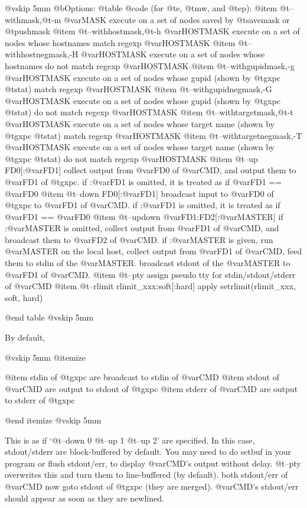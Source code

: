 @vskip 5mm
@b{Options: }
@table @code
(for @t{e}, @t{mw}, and @t{ep}):
@item   @t{--withmask},@t{-m} @var{MASK}
    execute on a set of nodes saved by @t{savemask} or @t{pushmask}
@item   @t{--withhostmask},@t{-h} @var{HOSTMASK}
    execute on a set of nodes whose hostnames match regexp @var{HOSTMASK}
@item   @t{--withhostnegmask},-H @var{HOSTMASK}
    execute on a set of nodes whose hostnames do not match regexp @var{HOSTMASK}
@item   @t{--withgupidmask},-g @var{HOSTMASK}
    execute on a set of nodes whose gupid (shown by @t{gxpc} @t{stat}) 
    match regexp @var{HOSTMASK}
@item   @t{--withgupidnegmask},-G @var{HOSTMASK}
    execute on a set of nodes whose gupid (shown by @t{gxpc} @t{stat}) 
    do not match regexp @var{HOSTMASK}
@item   @t{--withtargetmask},@t{-t} @var{HOSTMASK}
    execute on a set of nodes whose target name (shown by @t{gxpc} @t{stat}) 
    match regexp @var{HOSTMASK}
@item   @t{--withtargetnegmask},-T @var{HOSTMASK}
    execute on a set of nodes whose target name (shown by @t{gxpc} @t{stat}) 
    do not match regexp @var{HOSTMASK}
@item   @t{--up} FD0[:@var{FD1}]
    collect output from @var{FD0} of @var{CMD}, and output them to @var{FD1} of @t{gxpc}.
    if :@var{FD1} is omitted, it is treated as if @var{FD1} == @var{FD0}
@item   @t{--down} FD0[:@var{FD1}]
    broadcast input to @var{FD0} of @t{gxpc} to @var{FD1} of @var{CMD}.
    if :@var{FD1} is omitted, it is treated as if @var{FD1} == @var{FD0}
@item   @t{--updown} @var{FD1}:FD2[:@var{MASTER}]
    if :@var{MASTER} is omitted, collect output from @var{FD1} of @var{CMD},
    and broadcast them to @var{FD2} of @var{CMD}.
    if :@var{MASTER} is given, run @var{MASTER} on the local host, collect
    output from @var{FD1} of @var{CMD}, feed them to stdin of the @var{MASTER}.
    broadcast stdout of the @var{MASTER} to @var{FD1} of @var{CMD}.
@item   @t{--pty}
    assign pseudo tty for stdin/stdout/stderr of @var{CMD}
@item   @t{--rlimit} rlimit_xxx:soft[:hard]
    apply setrlimit(rlimit_xxx, soft, hard)

@end table
@vskip 5mm

By default,

@vskip 5mm
@itemize

@item  stdin of @t{gxpc} are broadcast to stdin of @var{CMD}
@item  stdout of @var{CMD} are output to stdout of @t{gxpc}
@item  stderr of @var{CMD} are output to stderr of @t{gxpc}

@end itemize
@vskip 5mm

This is as if `@t{--down} 0 @t{--up} 1 @t{--up} 2' are specified.  In this
case, stdout/stderr are block-buffered by default.  You may need
to do setbuf in your program or flush stdout/err, to display
@var{CMD}'s output without delay.  @t{--pty} overwrites this and turn them
to line-buffered (by default).  both stdout/err of @var{CMD} now goto
stdout of @t{gxpc} (they are merged).  @var{CMD}'s stdout/err should appear
as soon as they are newlined.

